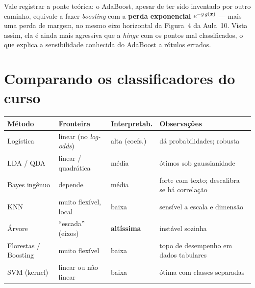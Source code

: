 \documentclass[11pt,a4paper]{article}
\begin{document}
\begin{observacao}
Vale registrar a ponte teórica: o AdaBoost, apesar de ter sido inventado por outro
caminho, equivale a fazer \emph{boosting} com a \textbf{perda exponencial}
$e^{-y\,g(\bm{x})}$ --- mais uma perda de margem, no mesmo eixo horizontal da
Figura~4 da Aula~10. Vista assim, ela é ainda mais agressiva que a \emph{hinge} com
os pontos mal classificados, o que explica a sensibilidade conhecida do AdaBoost a
rótulos errados.
\end{observacao}

\section{Comparando os classificadores do curso}
\begin{center}\small
\renewcommand{\arraystretch}{1.3}
\begin{tabular}{@{}lp{3.5cm}p{3.2cm}p{3.6cm}@{}}
\toprule
\textbf{Método} & \textbf{Fronteira} & \textbf{Interpretab.} & \textbf{Observações} \\
\midrule
Logística & linear (no \emph{log-odds}) & alta (coefs.) & dá probabilidades; robusta \\
LDA / QDA & linear / quadrática & média & ótimos sob gaussianidade \\
Bayes ingênuo & depende & média & forte com texto; descalibra se há correlação \\
KNN & muito flexível, local & baixa & sensível a escala e dimensão \\
Árvore & ``escada'' (eixos) & \textbf{altíssima} & instável sozinha \\
Florestas / Boosting & muito flexível & baixa & topo de desempenho em dados tabulares \\
SVM (kernel) & linear ou não linear & baixa & ótima com classes separadas \\
\bottomrule
\end{tabular}
\end{center}
\end{document}
